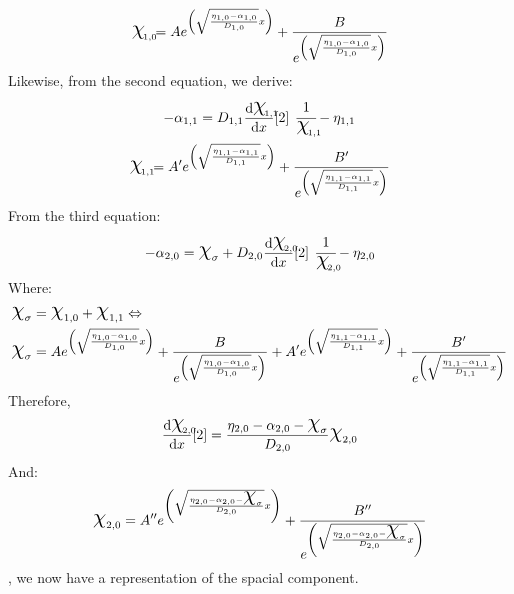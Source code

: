 \documentclass[class={myRUCProject}, crop=false]{standalone}
\providecommand\ndex[2]{{\raisebox{0ex}[0ex][0ex]{\raisebox{-0.25ex}{$_{\footnotesize\!\mathrlap{#1,#2}}\ \> $}}}}
\providecommand\Chi{\scalebox{1.5}{{\raisebox{0.15ex}{$\chi$}}}}
\begin{document}
\begin{align}
    \Chi\ndex{1}{0} = A e^{\left(\sqrt{\frac{\eta_{1,0} - \alpha_{1,0}}{D_{1,0}}}x\right)} + \frac{B}{e^{\left(\sqrt{\frac{\eta_{1,0} - \alpha_{1,0}}{D_{1,0}}}x\right)}} \label{eq:1}
\end{align}
Likewise, from the second equation, we derive:
\begin{align}
    -\alpha_{1,1} =  D_{1,1}\ode[x]{\Chi\ndex{1}{1}}[2]\>\, \cfrac{1}{\Chi\ndex{1}{1}} - \eta_{1,1} \nonumber
\end{align}
\begin{align}
    \Chi\ndex{1}{1} = A' e^{\left(\sqrt{\frac{\eta_{1,1} - \alpha_{1,1}}{D_{1,1}}}x\right)} + \frac{B'}{e^{\left(\sqrt{\frac{\eta_{1,1} - \alpha_{1,1}}{D_{1,1}}}x\right)}} \label{eq:2}
\end{align}
From the third equation:
\begin{align}
    -\alpha_{2,0} =
    \Chi_{\sigma} +  D_{2,0}\ode[x]{\Chi\ndex{2}{0}}[2] \>\,\cfrac{1}{\Chi\ndex{2}{0}} - \eta_{2,0} \nonumber
\end{align}
Where:
\begin{align}
    \Chi_{\sigma} &= \Chi_{1,0} + \Chi_{1,1} \iff  \\ 
    \Chi_{\sigma} &= A e^{\left(\sqrt{\frac{\eta_{1,0} - \alpha_{1,0}}{D_{1,0}}}x\right)} + \frac{B}{e^{\left(\sqrt{\frac{\eta_{1,0} - \alpha_{1,0}}{D_{1,0}}}x\right)}} + A' e^{\left(\sqrt{\frac{\eta_{1,1} - \alpha_{1,1}}{D_{1,1}}}x\right)} + \frac{B'}{e^{\left(\sqrt{\frac{\eta_{1,1} - \alpha_{1,1}}{D_{1,1}}}x\right)}} \nonumber
\end{align}
Therefore,
\begin{align}
    \ode[x]{\Chi\ndex{2}{0}}[2] = \frac{\eta_{2,0}-\alpha_{2,0}-\Chi_{\sigma}}{D_{2,0}} \Chi_{2,0}
\end{align}
And:
\begin{align}
    \Chi_{2,0} = A'' e^{\left(\sqrt{\frac{\eta_{2,0}-\alpha_{2,0}-\Chi_{\sigma}}{D_{2,0}}}x\right)}
    + 
    \frac{B''}{e^{\left(\sqrt{\frac{\eta_{2,0}-\alpha_{2,0}-\Chi_{\sigma}}{D_{2,0}}}x\right)}} \label{eq:3}
\end{align}
{}, we now have a representation of the spacial component.

\end{document}
